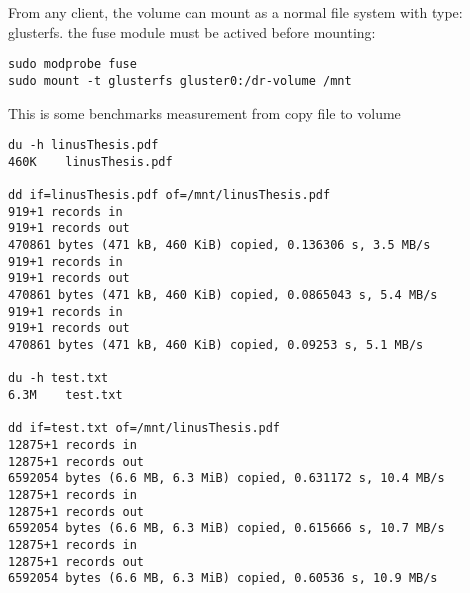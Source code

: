 \documentclass{article}
\begin{document}
From any client, the volume can mount as a normal file system with type: glusterfs. the fuse module must
be actived before mounting:
\begin{verbatim}
sudo modprobe fuse
sudo mount -t glusterfs gluster0:/dr-volume /mnt
\end{verbatim}

This is some benchmarks measurement from copy file to volume
\begin{verbatim}
du -h linusThesis.pdf
460K	linusThesis.pdf

dd if=linusThesis.pdf of=/mnt/linusThesis.pdf
919+1 records in
919+1 records out
470861 bytes (471 kB, 460 KiB) copied, 0.136306 s, 3.5 MB/s
919+1 records in
919+1 records out
470861 bytes (471 kB, 460 KiB) copied, 0.0865043 s, 5.4 MB/s
919+1 records in
919+1 records out
470861 bytes (471 kB, 460 KiB) copied, 0.09253 s, 5.1 MB/s

du -h test.txt
6.3M	test.txt

dd if=test.txt of=/mnt/linusThesis.pdf
12875+1 records in
12875+1 records out
6592054 bytes (6.6 MB, 6.3 MiB) copied, 0.631172 s, 10.4 MB/s
12875+1 records in
12875+1 records out
6592054 bytes (6.6 MB, 6.3 MiB) copied, 0.615666 s, 10.7 MB/s
12875+1 records in
12875+1 records out
6592054 bytes (6.6 MB, 6.3 MiB) copied, 0.60536 s, 10.9 MB/s
\end{verbatim}
\end{document}
